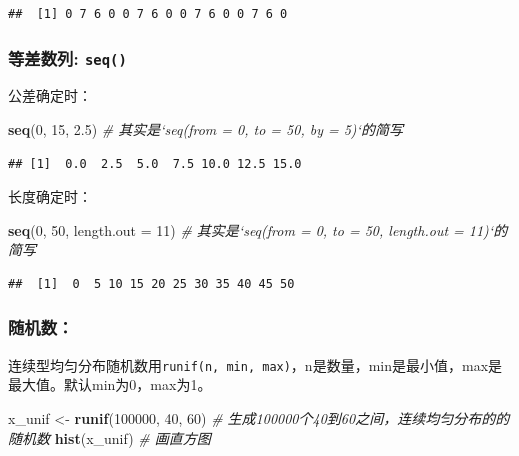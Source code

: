 \documentclass[]{book}
\newenvironment{Shaded}{\begin{snugshade}}{\end{snugshade}}
\newcommand{\CommentTok}[1]{\textcolor[rgb]{0.56,0.35,0.01}{\textit{#1}}}
\newcommand{\DataTypeTok}[1]{\textcolor[rgb]{0.13,0.29,0.53}{#1}}
\newcommand{\DecValTok}[1]{\textcolor[rgb]{0.00,0.00,0.81}{#1}}
\newcommand{\FloatTok}[1]{\textcolor[rgb]{0.00,0.00,0.81}{#1}}
\newcommand{\KeywordTok}[1]{\textcolor[rgb]{0.13,0.29,0.53}{\textbf{#1}}}
\newcommand{\NormalTok}[1]{#1}
\newcommand{\StringTok}[1]{\textcolor[rgb]{0.31,0.60,0.02}{#1}}
\begin{document}
\begin{verbatim}
##  [1] 0 7 6 0 0 7 6 0 0 7 6 0 0 7 6 0
\end{verbatim}

\hypertarget{-seq}{%
\subsubsection{\texorpdfstring{等差数列: \texttt{seq()}}{等差数列: seq()}}\label{-seq}}

公差确定时：

\begin{Shaded}
\begin{Highlighting}[]
\KeywordTok{seq}\NormalTok{(}\DecValTok{0}\NormalTok{, }\DecValTok{15}\NormalTok{, }\FloatTok{2.5}\NormalTok{) }\CommentTok{# 其实是`seq(from = 0, to = 50, by = 5)`的简写}
\end{Highlighting}
\end{Shaded}

\begin{verbatim}
## [1]  0.0  2.5  5.0  7.5 10.0 12.5 15.0
\end{verbatim}

长度确定时：

\begin{Shaded}
\begin{Highlighting}[]
 \KeywordTok{seq}\NormalTok{(}\DecValTok{0}\NormalTok{, }\DecValTok{50}\NormalTok{, }\DataTypeTok{length.out =} \DecValTok{11}\NormalTok{) }\CommentTok{# 其实是`seq(from = 0, to = 50, length.out = 11)`的简写}
\end{Highlighting}
\end{Shaded}

\begin{verbatim}
##  [1]  0  5 10 15 20 25 30 35 40 45 50
\end{verbatim}

\subsubsection{随机数：}

连续型均匀分布随机数用\texttt{runif(n,\ min,\ max)}，n是数量，min是最小值，max是最大值。默认min为0，max为1。

\begin{Shaded}
\begin{Highlighting}[]
\NormalTok{x_unif <-}\StringTok{ }\KeywordTok{runif}\NormalTok{(}\DecValTok{100000}\NormalTok{, }\DecValTok{40}\NormalTok{, }\DecValTok{60}\NormalTok{) }\CommentTok{# 生成100000个40到60之间，连续均匀分布的的随机数}
\KeywordTok{hist}\NormalTok{(x_unif) }\CommentTok{# 画直方图}
\end{Highlighting}
\end{Shaded}
\end{document}
